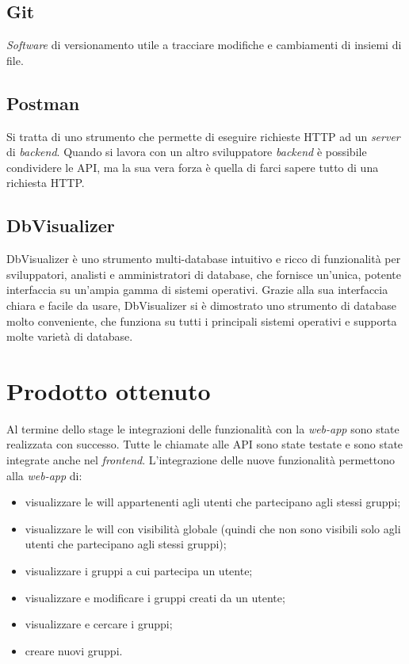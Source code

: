 \subsection{Git}
\textit{Software} di versionamento utile a tracciare modifiche e cambiamenti di insiemi di file.
\subsection{Postman}
Si tratta di uno strumento che permette di eseguire richieste HTTP ad un \textit{server} di \textit{backend}. Quando si lavora con un altro sviluppatore 
\textit{backend} è possibile condividere le \gls{API}, ma la sua vera forza è quella di farci sapere tutto di una richiesta HTTP.
\subsection{DbVisualizer}
DbVisualizer è uno strumento multi-database intuitivo e ricco di funzionalità per sviluppatori, analisti e amministratori di database, che fornisce 
un'unica, potente interfaccia su un'ampia gamma di sistemi operativi. Grazie alla sua interfaccia chiara e facile da usare, DbVisualizer si è dimostrato 
uno strumento di database molto conveniente, che funziona su tutti i principali sistemi operativi e supporta molte varietà di database. 


\section{Prodotto ottenuto}
Al termine dello stage le integrazioni delle funzionalità con la \textit{web-app} sono state realizzata con successo. Tutte le chiamate alle \gls{API} 
sono state testate e sono state integrate anche nel \textit{frontend}. 
L'integrazione delle nuove funzionalità permettono alla \textit{web-app} di: 
\begin{itemize}
    \item  visualizzare le \gls{will} appartenenti agli utenti che partecipano agli stessi 
    gruppi;
    \item visualizzare le \gls{will} con visibilità globale (quindi che non sono visibili solo agli utenti che partecipano agli stessi gruppi);
    \item visualizzare i gruppi a cui partecipa un utente;
    \item visualizzare e modificare i gruppi creati da un utente;
    \item visualizzare e cercare i gruppi;
    \item creare nuovi gruppi.
\end{itemize}
\pagebreak
